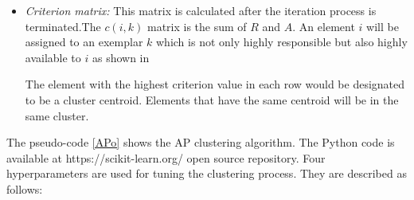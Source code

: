 \documentclass[../UNBThesis2.tex]{subfiles}
\begin{document}
\begin{itemize}
  \item\textit{Criterion matrix:} This matrix is calculated after the iteration process is terminated.The $c (i,k)$ matrix is the sum of $R$ and $A$. An element $i$ will be assigned to an exemplar $k$ which is not only highly responsible but also highly available to $i$  as shown in 
  
  

The element with the highest criterion value in each row would be designated to be a cluster centroid. Elements that have the same centroid will be in the same cluster.







\end{itemize}

The pseudo-code \ref{APo} shows the AP clustering algorithm. The Python code is available at https://scikit-learn.org/ open source repository. Four hyperparameters are used for tuning the clustering process. They are described as follows: 
\end{document}
